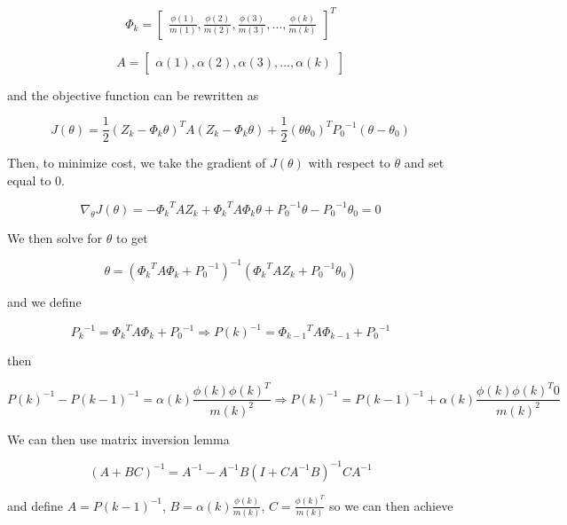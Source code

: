\documentclass{article}
\begin{document}
\[
\Phi_k =
\begin{bmatrix}
\frac{\phi(1)}{m(1)},\frac{\phi(2)}{m(2)},\frac{\phi(3)}{m(3)},...,\frac{\phi(k)}{m(k)}
\end{bmatrix}^T
\]

\[
A = 
\begin{bmatrix}
\alpha(1),\alpha(2),\alpha(3),...,\alpha(k)
\end{bmatrix}
\]

and the objective function can be rewritten as

\begin{equation}
J(\theta) = \frac{1}{2} (Z_k - \Phi_k \theta)^T A (Z_k - \Phi_k \theta) + \frac{1}{2} (\theta \theta_0)^T {P_0}^{-1} (\theta - \theta_0)
\end{equation}

Then, to minimize cost, we take the gradient of $J(\theta)$ with respect to $\theta$ and set equal to $0$.

\begin{equation}
\nabla_\theta J(\theta) = - {\Phi_k}^T A Z_k + {\Phi_k}^T A \Phi_k \theta + {P_0}^{-1} \theta - {P_0}^{-1} \theta_0 = 0
\end{equation}

We then solve for $\theta$ to get

\begin{equation}
\theta = ( {\Phi_k}^T A \Phi_k + {P_0}^{-1})^{-1} ( {\Phi_k}^T A Z_k + {P_0}^{-1} \theta_0)
\end{equation}

and we define

\begin{equation}
{P_k}^{-1} =  {\Phi_k}^T A \Phi_k + {P_0}^{-1} \Rightarrow P(k)^{-1} =  {\Phi_{k-1}}^T A \Phi_{k-1} + {P_0}^{-1}
\end{equation}

then

\begin{equation}
P(k)^{-1} - P(k-1)^{-1} = \alpha (k) \frac{\phi(k)\phi(k)^T}{m(k)^2} \Rightarrow P(k)^{-1} = P(k-1)^{-1} + \alpha (k) \frac{\phi(k)\phi(k)^T0}{m(k)^2}
\end{equation}

We can then use matrix inversion lemma

\begin{equation}
(A+BC)^{-1} = A^{-1}-A^{-1}B(I+CA^{-1}B)^{-1}CA^{-1}
\end{equation}

and define $A=P(k-1)^{-1}$, $B=\alpha(k)\frac{\phi(k)}{m(k)}$, $C=\frac{\phi(k)^T}{m(k)}$ so we can then achieve
\end{document}

